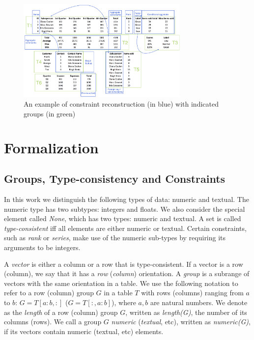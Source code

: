 \documentclass{ecai}
\begin{document}
\begin{figure}[tbh]
  \begin{center}
    \includegraphics[width=0.75\textwidth]{figures/Demo.png}
  \end{center}
  \vspace{-10pt}
  \caption{An example of constraint reconstruction (in blue) with indicated groups (in green)}
  \label{fig:main_example}
\end{figure}

\section{Formalization}


\subsection{Groups, Type-consistency and Constraints}
In this work we distinguish the following types of data: numeric and textual. The numeric type has two subtypes: integers and floats. We also consider the special element called \textit{None}, which has two types: numeric and textual. A set is called \textit{type-consistent} iff all elements are either numeric or textual. Certain constraints, such as \textit{rank} or \textit{series}, make use of the numeric sub-types by requiring its arguments to be integers.

A \textit{vector} is either a column or a row that is type-consistent. If a vector is a row (column), we say that it has a \textit{row} (\textit{column}) orientation. A \textit{group} is a subrange of vectors with the same orientation in a table. We use the following notation to refer to a row (column) group $G$ in a table $T$ with rows (columns) ranging from $a$ to $b$: $G = T[a{:}b,:]$ ($G = T[{:},a{:}b]$), where $a,b$ are natural numbers. We denote as the \textit{length} of a row (column) group $G$, written as \textit{length(G)}, the number of its columns (rows). We call a group $G$ \textit{numeric} (\textit{textual}, etc), written as \textit{numeric(G)}, if its vectors contain numeric (textual, etc) elements.
\end{document}
